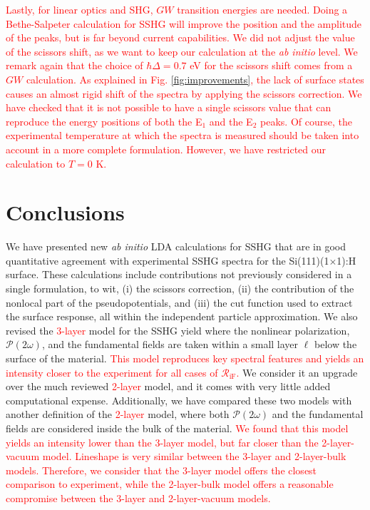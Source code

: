 \documentclass[prb,superscriptaddress,showpacs,twocolumn,letterpaper]{revtex4}
\newcommand{\correction}[1]{\textcolor{red}{#1}}
\newcommand{\change}[1]{\textcolor{red}{#1}}
\begin{document}
\correction{Lastly, 
for linear optics and SHG, $GW$ transition energies are needed. Doing a
Bethe-Salpeter calculation for SSHG will improve the position and the amplitude
of the peaks, but is far beyond current capabilities.\cite{puff} We did not
adjust the value of the scissors shift, as we want to keep our calculation at
the {\em ab initio} level. We remark again that the choice of $\hbar\Delta=0.7$
eV for the scissors shift comes from a $GW$ calculation.\cite{liPRB10} As
explained in Fig. \ref{fig:improvements}, the lack of surface states causes an
almost rigid shift of the spectra by applying the scissors correction. We have
checked that it is not possible to have a single scissors value that can
reproduce the energy positions of both the E$_{1}$ and the E$_{2}$ peaks. Of
course, the experimental temperature at which the spectra is measured should be
taken into account in a more complete formulation. However, we have restricted
our calculation to $T=0$ K.} %


\section{Conclusions}\label{sec:conclusions}

We have presented new \emph{ab initio} LDA calculations for SSHG that are in
good quantitative agreement with experimental SSHG spectra for the
Si(111)(1$\times$1):H surface. These calculations include contributions not
previously considered in a single formulation, to wit, (i) the scissors
correction, (ii) the contribution of the nonlocal part of the pseudopotentials,
and (iii) the cut function used to extract the surface response, all within the
independent particle approximation. We also revised the \correction{3-layer}
model for the SSHG yield where the nonlinear polarization,
$\boldsymbol{\mathcal{P}}(2\omega)$, and the fundamental fields are taken within
a small layer $\ell$ below the surface of the material.
\change{This model reproduces key spectral features and yields an intensity
closer to the experiment for all cases of $\mathcal{R}_{\mathrm{iF}}$.} %
We consider it an upgrade over the much reviewed \correction{2-layer}
model\cite{mizrahiJOSA88}, and it comes with very little added computational
expense. Additionally, we have compared these two models with another definition
of the \correction{2-layer} model, where both
$\boldsymbol{\mathcal{P}}(2\omega)$ and the fundamental fields are considered
inside the bulk of the material.
\change{We found that this model yields an intensity
lower than the
\correction{3-layer} model, but far closer than the
\correction{2-layer-vacuum} model. Lineshape is very similar between the
\correction{3-layer} and \correction{2-layer-bulk} models. Therefore, we
consider that the
\correction{3-layer} model offers the closest comparison to experiment, while
the \correction{2-layer-bulk} model offers a reasonable compromise between the
\correction{3-layer} and \correction{2-layer-vacuum} models.} %
\end{document}
